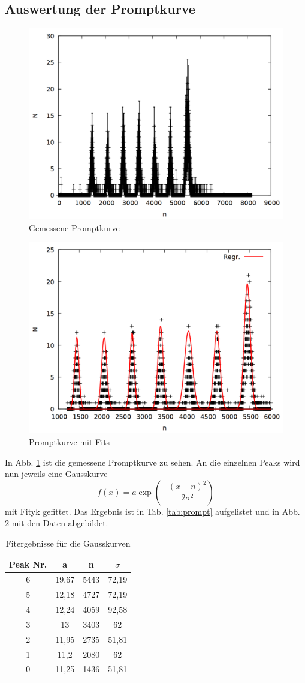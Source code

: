 \subsection{Auswertung der Promptkurve}

\begin{figure}
\centering
\includegraphics[width=0.7\linewidth]{data/prompt.png}
\caption{Gemessene Promptkurve}
\label{fig:prompt}
\end{figure}

\begin{figure}
\centering
\includegraphics[width=0.7\linewidth]{data/prompt2.png}
\caption{Promptkurve mit Fits}
\label{fig:prompt2}
\end{figure}

In Abb. \ref{fig:prompt} ist die gemessene Promptkurve zu sehen. An die einzelnen Peaks wird nun jeweils eine Gausskurve \[f(x) = a\exp{\left(-\frac{(x-n)^2}{2\sigma^2}\right)}\]mit Fityk gefittet. Das Ergebnis ist in Tab. \ref{tab:prompt} aufgelistet und in Abb. \ref{fig:prompt2} mit den Daten abgebildet.

\begin{table}
\centering
\caption{Fitergebnisse für die Gausskurven}
\begin{tabular}{cccc}
\toprule
Peak Nr. & a & n & $\sigma$\\
\midrule
6&	19,67&	5443&	72,19\\
5&	12,18&	4727&	72,19\\
4&	12,24&	4059&	92,58\\
3&	13&	3403&	62\\
2&	11,95&	2735&	51,81\\
1&	11,2&	2080&	62\\
0&	11,25&	1436&	51,81\\
\bottomrule
\end{tabular}
\end{table}

